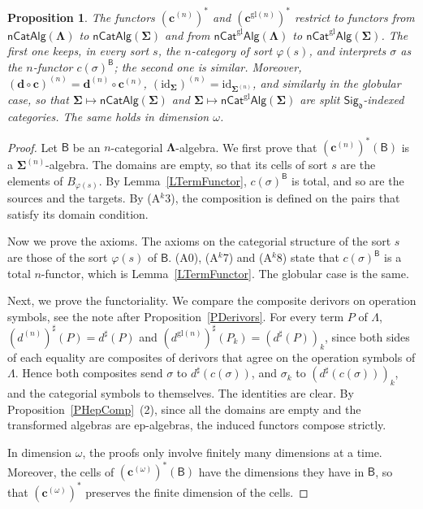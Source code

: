 \documentclass[a4paper,reqno]{amsart}
\newcommand{\sig}[1]{\mathbf{#1}}                %
\newcommand{\calg}[1]{\boldsymbol{\mathsf{#1}}}  %
\newcommand{\id}{\mathrm{id}}
\newcommand{\gl}{\mathrm{gl}}
\theoremstyle{plain}
\newtheorem{proposition}[theorem]{Proposition}
\theoremstyle{definition}
\begin{document}
\begin{proposition}\label{PChangeSigDerivor}
The functors $(\mathbf{c}^{(n)})^{\ast}$ and $(\mathbf{c}^{\gl(n)})^{\ast}$ restrict to functors from $\mathsf{nCatAlg}(\sig{\Lambda})$ to $\mathsf{nCatAlg}(\sig{\Sigma})$ and from $\mathsf{nCat}^{\gl}\mathsf{Alg}(\sig{\Lambda})$ to $\mathsf{nCat}^{\gl}\mathsf{Alg}(\sig{\Sigma})$.
The first one keeps, in every sort $s$, the $n$-category of sort $\varphi(s)$, and interprets $\sigma$ as the $n$-functor $c(\sigma)^{\calg{B}}$; the second one is similar.
Moreover, $(\mathbf{d}\circ\mathbf{c})^{(n)}=\mathbf{d}^{(n)}\circ\mathbf{c}^{(n)}$, $(\id_{\sig{\Sigma}})^{(n)}=\id_{\sig{\Sigma}^{(n)}}$, and similarly in the globular case, so that $\sig{\Sigma}\mapsto\mathsf{nCatAlg}(\sig{\Sigma})$ and $\sig{\Sigma}\mapsto\mathsf{nCat}^{\gl}\mathsf{Alg}(\sig{\Sigma})$ are split $\mathsf{Sig}_{\mathfrak{d}}$-indexed categories.
The same holds in dimension $\omega$.
\end{proposition}
\begin{proof}
Let $\calg{B}$ be an $n$-categorial $\sig{\Lambda}$-algebra.
We first prove that $(\mathbf{c}^{(n)})^{\ast}(\calg{B})$ is a $\sig{\Sigma}^{(n)}$-algebra.
The domains are empty, so that its cells of sort $s$ are the elements of $B_{\varphi(s)}$.
By Lemma~\ref{LTermFunctor}, $c(\sigma)^{\calg{B}}$ is total, and so are the sources and the targets.
By (A$^{k}$3), the composition is defined on the pairs that satisfy its domain condition.

Now we prove the axioms.
The axioms on the categorial structure of the sort $s$ are those of the sort $\varphi(s)$ of $\calg{B}$.
(A0), (A$^{k}$7) and (A$^{k}$8) state that $c(\sigma)^{\calg{B}}$ is a total $n$-functor, which is Lemma~\ref{LTermFunctor}.
The globular case is the same.

Next, we prove the functoriality.
We compare the composite derivors on operation symbols, see the note after Proposition~\ref{PDerivors}.
For every term $P$ of $\Lambda$, $(d^{(n)})^{\sharp}(P)=d^{\sharp}(P)$ and $(d^{\gl(n)})^{\sharp}(P_{k})=(d^{\sharp}(P))_{k}$, since both sides of each equality are composites of derivors that agree on the operation symbols of $\Lambda$.
Hence both composites send $\sigma$ to $d^{\sharp}(c(\sigma))$, and $\sigma_{k}$ to $(d^{\sharp}(c(\sigma)))_{k}$, and the categorial symbols to themselves.
The identities are clear.
By Proposition~\ref{PHepComp}~(2), since all the domains are empty and the transformed algebras are ep-algebras, the induced functors compose strictly.

In dimension $\omega$, the proofs only involve finitely many dimensions at a time.
Moreover, the cells of $(\mathbf{c}^{(\omega)})^{\ast}(\calg{B})$ have the dimensions they have in $\calg{B}$, so that $(\mathbf{c}^{(\omega)})^{\ast}$ preserves the finite dimension of the cells.
\end{proof}
\end{document}
